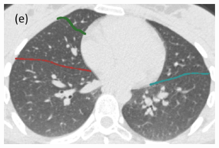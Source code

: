\documentclass[]{spie}  %
\begin{document}
{\begin{figure}[htbp]
\begin{subfigure}
{\begin{minipage}[t]{0.2\linewidth}
  \includegraphics[width=\linewidth,trim={{.0\wd0} {.0\wd0} {.0\wd0} {.0\wd0}},clip]{Image/H1335_FRC_PCAInitial_Axial.png}
  \centerline{}
	\end{minipage}%
   }%
  \label{fig:HLASegmentationResults-e} 
\end{subfigure}
\begin{subfigure}{
  \begin{minipage}[t]{0.2\linewidth}

\end{minipage}}
\end{subfigure}
\end{figure}}
\end{document}
